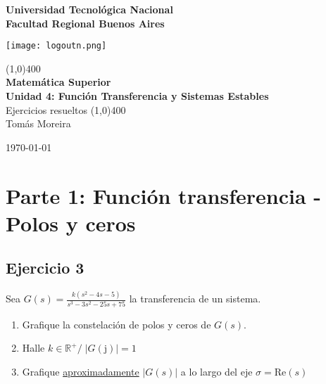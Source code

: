 \documentclass[11pt]{article}
\def\imj{\mathrm{j}}
\begin{document}
		
	\begin{titlepage}
		\begin{center}
			\vspace*{0.5cm}
			\Large{\textbf{Universidad Tecnológica Nacional}}\\
			\Large{\textbf{Facultad Regional Buenos Aires}}\\
			\begin{center}
				\texttt{[image: logoutn.png]}
			\end{center}
			\vfill
			\line(1,0){400}\\
			\vspace*{0.3cm}
			\huge{\textbf{Matemática Superior}}\\
			\Large{\textbf{Unidad 4: Función Transferencia y Sistemas Estables}}\\
			\large{Ejercicios resueltos}
			\line(1,0){400}\\
			\vfill
			Tomás Moreira \\
			
			
			\today
				
				
		\end{center}
	\end{titlepage}

	\tableofcontents
	\thispagestyle{empty}
	\clearpage

	\setcounter{page}{1}
	
	\section{Parte 1: Función transferencia - Polos y ceros}
	\subsection{Ejercicio 3}
	Sea $\displaystyle G(s)=\frac{k(s^2-4s-5)}{s^3-3s^2-25s+75}$ la transferencia de un sistema.
	\begin{enumerate}[label=(\alph*)]
		\item Grafique la constelación de polos y ceros de $G(s)$.
		\item Halle $k \in \mathbb{R}^{+} / \; |G(\imj)|=1$
		\item Grafique \underline{aproximadamente} $|G(s)|$ a lo largo del eje $\sigma=\text{Re}(s)$
	\end{enumerate}
\end{document}
